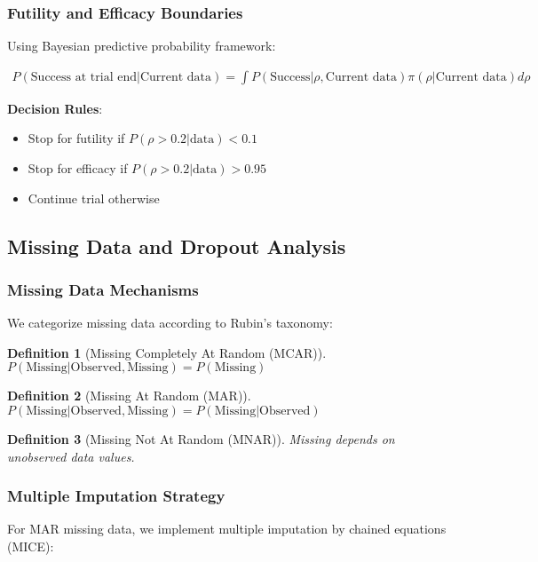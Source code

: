 \documentclass[11pt]{article}
\newtheorem{definition}{Definition}
\begin{document}
\subsubsection{Futility and Efficacy Boundaries}
Using Bayesian predictive probability framework:

\begin{align}
P(\text{Success at trial end} | \text{Current data}) = \int P(\text{Success} | \rho, \text{Current data}) \pi(\rho | \text{Current data}) d\rho
\end{align}

\textbf{Decision Rules}:
\begin{itemize}
    \item Stop for futility if $P(\rho > 0.2 | \text{data}) < 0.1$
    \item Stop for efficacy if $P(\rho > 0.2 | \text{data}) > 0.95$
    \item Continue trial otherwise
\end{itemize}

\subsection{Missing Data and Dropout Analysis}

\subsubsection{Missing Data Mechanisms}
We categorize missing data according to Rubin's taxonomy:

\begin{definition}[Missing Completely At Random (MCAR)]
$P(\text{Missing} | \text{Observed}, \text{Missing}) = P(\text{Missing})$
\end{definition}

\begin{definition}[Missing At Random (MAR)]
$P(\text{Missing} | \text{Observed}, \text{Missing}) = P(\text{Missing} | \text{Observed})$
\end{definition}

\begin{definition}[Missing Not At Random (MNAR)]
Missing depends on unobserved data values.
\end{definition}

\subsubsection{Multiple Imputation Strategy}
For MAR missing data, we implement multiple imputation by chained equations (MICE):
\end{document}
